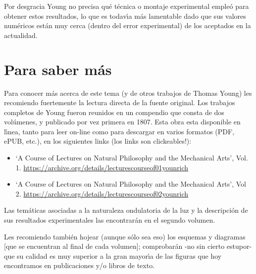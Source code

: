 \documentclass{article}
\begin{document}
Por desgracia Young no precisa 
qu\'e t\'ecnica o montaje experimental emple\'o para obtener estos 
resultados, lo que es todav\'\i a m\'as lamentable dado que sus valores
num\'ericos est\'an muy cerca (dentro del error experimental) de los
aceptados en la actualidad.


\section*{Para saber m\'as}

Para conocer m\'as acerca de este tema (y de otros trabajos de Thomas Young)
les recomiendo fuertemente la lectura directa de la fuente original.
Los trabajos completos de Young fueron reunidos en un compendio que 
consta de dos vol\'umenes, y publicado por vez primera en 1807. 
Esta obra esta disponible en l\'\i nea, tanto para leer on-line
como para descargar en varios formatos (PDF, ePUB, etc.), en los
siguientes links (los links son clickeables!):

\begin{itemize}
    \item `A Course of Lectures on Natural Philosophy and the Mechanical Arts',
        Vol. 1. \url{https://archive.org/details/lecturescourseof01younrich}
    \item `A Course of Lectures on Natural Philosophy and the Mechanical Arts',
        Vol 2. \url{https://archive.org/details/lecturescourseof02younrich}
\end{itemize}

Las tem\'aticas asociadas a la naturaleza ondulatoria de la luz y la
descripci\'on de sus resultados experimentales las encontrar\'an en el
segundo volumen. 

Les recomiendo tambi\'en hojear (aunque s\'olo sea eso) los esquemas
y diagramas [que se encuentran al final de cada volumen]; comprobar\'an 
-no sin cierto estupor- que
su calidad es muy superior a la gran mayor\'\i a de las figuras que 
hoy encontramos en publicaciones y/o libros de texto.
\end{document}
